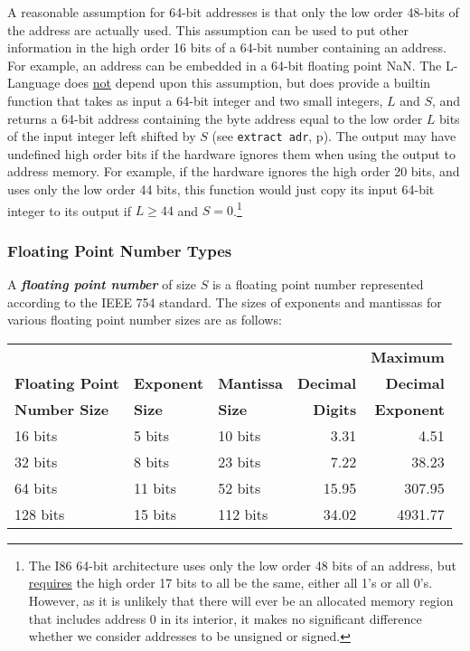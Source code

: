 \documentclass[12pt]{article}
\newcommand{\key}[1]{{\bf \em #1}\index{#1}}
\newcommand{\pagref}[1]{p\pageref{#1}}
\begin{document}
A reasonable assumption for 64-bit addresses is that only the low
order 48-bits of the address are actually used.  This assumption can
be used to put other information in the high order 16 bits
of a 64-bit number containing an address.  For example, an address
can be embedded in a 64-bit floating point NaN.  The L-Language does
\underline{not} depend upon this assumption, but does provide a builtin function
that takes as input a 64-bit integer and two small integers, $L$ and $S$,
and returns a 64-bit address containing
the byte address equal to the low order $L$ bits of the input integer
left shifted by $S$ (see {\tt extract adr}, \pagref{EXTRACT-ADR}).
The output may have undefined high order bits if
the hardware ignores them when using the output to address memory.
For example, if the hardware ignores the high order 20 bits, and uses only the
low order 44 bits,
this function would just copy its input 64-bit integer to its output
if $L\geq 44$ and $S=0$.\footnote{The I86 64-bit architecture
uses only the low order 48 bits of an address, but \underline{requires}
the high order 17 bits to all be the same, either all 1's or all 0's.
However, as it is unlikely that there will ever be an allocated memory region
that includes address 0 in its interior, it makes no significant difference
whether we consider addresses to be unsigned or signed.}

\subsubsection{Floating Point Number Types}

A \key{floating point number} of size $S$ is a floating point number
represented according to the IEEE 754 standard.  The sizes of exponents
and mantissas for various floating point number sizes are as follows:

\begin{center}
\begin{tabular}{l@{~~~~~~}l@{~~~~~~}l@{~~~~~~}r@{~~~~~~}r}
                   &              &              &             & \bf Maximum \\
\bf Floating Point & \bf Exponent & \bf Mantissa & \bf Decimal & \bf Decimal\\
\bf Number Size    & \bf Size     & \bf Size     & \bf Digits  & \bf Exponent
\\[2ex]
16 bits & 5 bits & 10 bits & 3.31 & 4.51 \\
32 bits & 8 bits & 23 bits & 7.22 & 38.23 \\
64 bits & 11 bits & 52 bits & 15.95 & 307.95 \\
128 bits & 15 bits & 112 bits & 34.02 & 4931.77 \\
\end{tabular}
\end{center}
\end{document}
